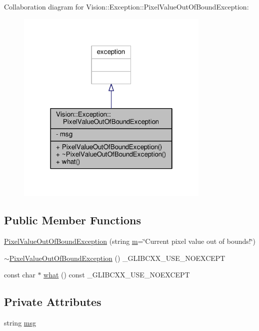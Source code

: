 Collaboration diagram for Vision\+:\+:Exception\+:\+:Pixel\+Value\+Out\+Of\+Bound\+Exception\+:\nopagebreak
\begin{figure}[H]
\begin{center}
\leavevmode
\includegraphics[width=262pt]{class_vision_1_1_exception_1_1_pixel_value_out_of_bound_exception__coll__graph}
\end{center}
\end{figure}
\subsection*{Public Member Functions}
\begin{DoxyCompactItemize}
\item 
\hyperlink{class_vision_1_1_exception_1_1_pixel_value_out_of_bound_exception_aabf807476a795d143fb01d076a2c1482}{Pixel\+Value\+Out\+Of\+Bound\+Exception} (string \hyperlink{_gen_blob_8m_ab3cd915d758008bd19d0f2428fbb354a}{m}=\char`\"{}Current pixel value out of bounds!\char`\"{})
\item 
\hyperlink{class_vision_1_1_exception_1_1_pixel_value_out_of_bound_exception_abf1093cf72cf8d1ac5beaee754d68ebc}{$\sim$\+Pixel\+Value\+Out\+Of\+Bound\+Exception} () \+\_\+\+G\+L\+I\+B\+C\+X\+X\+\_\+\+U\+S\+E\+\_\+\+N\+O\+E\+X\+C\+E\+P\+T
\item 
const char $\ast$ \hyperlink{class_vision_1_1_exception_1_1_pixel_value_out_of_bound_exception_a7f72688e1cf7271481dfe9dd591f1d2c}{what} () const \+\_\+\+G\+L\+I\+B\+C\+X\+X\+\_\+\+U\+S\+E\+\_\+\+N\+O\+E\+X\+C\+E\+P\+T
\end{DoxyCompactItemize}
\subsection*{Private Attributes}
\begin{DoxyCompactItemize}
\item 
string \hyperlink{class_vision_1_1_exception_1_1_pixel_value_out_of_bound_exception_a5e1cb97c34bdedca34b733d5cf16f8c2}{msg}
\end{DoxyCompactItemize}


